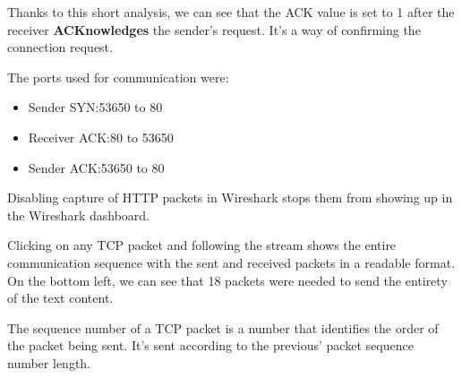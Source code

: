 Thanks to this short analysis, we can see that the ACK value is set to 1 after
the receiver \textbf{ACKnowledges} the sender's request. It's a way of
confirming the connection request.

The ports used for communication were:

\begin{itemize}
	\item Sender SYN:\@ 53650 to 80
	\item Receiver ACK:\@ 80 to 53650
	\item Sender ACK:\@ 53650 to 80
\end{itemize}

Disabling capture of HTTP packets in Wireshark stops them from showing up in
the Wireshark dashboard.

Clicking on any TCP packet and following the stream shows the entire
communication sequence with the sent and received packets in a readable format.
On the bottom left, we can see that 18 packets were needed to send the entirety
of the text content.

The sequence number of a TCP packet is a number that identifies the order of
the packet being sent. It's sent according to the previous' packet sequence
number length.
